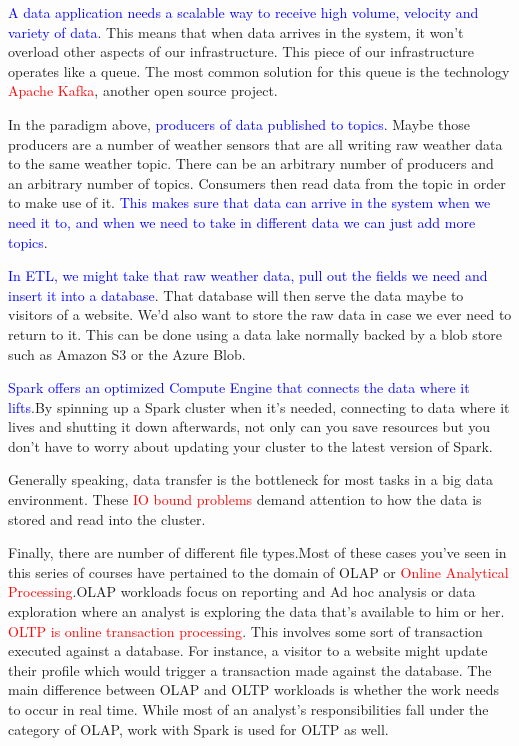 \documentclass[12pt]{article}
\newcommand{\redp}[1]{\textcolor{red}{#1}}
\newcommand{\bluep}[1]{\textcolor{blue}{#1}}
\begin{document}
\bluep{A data application needs a scalable way to receive high volume, velocity and variety of data}. This means that when data arrives in the system, it won't overload other aspects of our infrastructure. This piece of our infrastructure operates like a queue.
The most common solution for this queue is the technology \textcolor{red}{Apache Kafka}, another open source project. 

In the paradigm above, \bluep{producers of data published to topics.} Maybe those producers are a number of weather sensors that are all writing raw weather data to the same weather topic.
There can be an arbitrary number of
producers and an arbitrary number of topics. Consumers then read data
from the topic in order to make use of it. \bluep{This makes sure that data can arrive in the system when we need it to, and when we need to take in
different data we can just add more topics}. 

\bluep{In ETL, we might take that raw weather data, pull out the fields we need and insert it into a database}.
That database will then serve the data maybe to visitors of a website.
We'd also want to store the raw data in case we ever need to return to it.
This can be done using a data lake normally backed by a blob store such as Amazon S3 or the Azure Blob. 

\bluep{Spark offers an optimized Compute Engine that connects the data where it lifts}.By spinning up a Spark cluster when it's needed, connecting to data where it lives and shutting it down afterwards, not only can you save resources but you don't have to worry about updating your cluster to the latest version of Spark.

Generally speaking, data transfer is
the bottleneck for most tasks in a big data environment. These \redp{IO bound problems }demand attention to how the data is stored and read into the cluster.

Finally, there are number of different file types.Most of these cases you've seen in this series of courses have pertained to the domain of OLAP or \redp{Online Analytical Processing}.OLAP workloads focus on reporting and Ad hoc analysis
or data exploration where an analyst is exploring the data that's available to him or her. \redp{OLTP is online transaction processing}. This involves some sort of transaction executed against a database. For instance, a visitor to a website might update their profile which would trigger a transaction made against the database. The main difference between OLAP and OLTP workloads is whether the work needs to occur in real time. While most of an analyst's responsibilities fall under the category of OLAP, work with Spark is used for OLTP as well.
    
\end{document}
